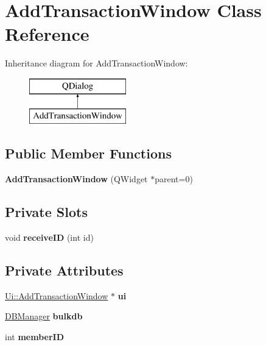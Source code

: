 \hypertarget{class_add_transaction_window}{}\section{Add\+Transaction\+Window Class Reference}
\label{class_add_transaction_window}
Inheritance diagram for Add\+Transaction\+Window\+:\begin{figure}[H]
\begin{center}
\leavevmode
\includegraphics[height=2.000000cm]{class_add_transaction_window}
\end{center}
\end{figure}
\subsection*{Public Member Functions}
\begin{DoxyCompactItemize}
\item 
\mbox{\label{class_add_transaction_window_ae7f76cc31a2b9b44c0ede5a5a2408138}} 
{\bfseries Add\+Transaction\+Window} (Q\+Widget $\ast$parent=0)
\end{DoxyCompactItemize}
\subsection*{Private Slots}
\begin{DoxyCompactItemize}
\item 
\mbox{\label{class_add_transaction_window_a6a63de5120babcfab16e54d9dbab7017}} 
void {\bfseries receive\+ID} (int id)
\end{DoxyCompactItemize}
\subsection*{Private Attributes}
\begin{DoxyCompactItemize}
\item 
\mbox{\label{class_add_transaction_window_a1215d580eaacb06b321863a0588f83b0}} 
\mbox{\hyperlink{class_ui_1_1_add_transaction_window}{Ui\+::\+Add\+Transaction\+Window}} $\ast$ {\bfseries ui}
\item 
\mbox{\label{class_add_transaction_window_a40b0d3b8bf8ea151871a05e373a92c50}} 
\mbox{\hyperlink{class_d_b_manager}{D\+B\+Manager}} {\bfseries bulkdb}
\item 
\mbox{\label{class_add_transaction_window_a4eeb7dd947d93f4bfe26d6d691c66b31}} 
int {\bfseries member\+ID}
\end{DoxyCompactItemize}


